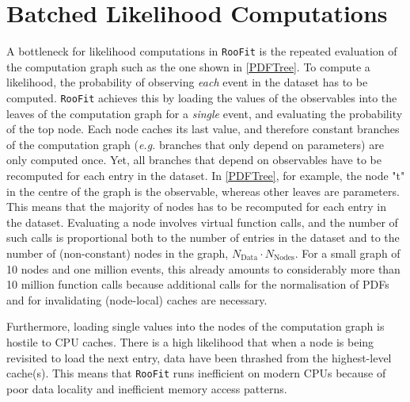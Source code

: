 \documentclass[a4paper]{jpconf}
\newcommand{\RooFit}{\texttt{RooFit}\xspace}
\begin{document}
\section{Batched Likelihood Computations}
A bottleneck for likelihood computations in \RooFit is the repeated evaluation of the computation graph such as the one 
shown in \cref{PDFTree}. To compute a likelihood, the probability of observing \textit{each} event in the dataset has to be computed.
\RooFit achieves this by loading the values of the observables into the leaves of the computation graph for a \textit{single} event, and evaluating the probability of
the top node. Each node caches its last value, and therefore constant branches of the computation graph (\textit{e.g.} branches that only 
depend on parameters) are only computed once.
Yet, all branches that depend on observables have to be recomputed for each entry in the dataset. In \cref{PDFTree}, for example, the node
"t" in the centre of the graph is the observable, whereas other leaves are parameters. This means that the majority of nodes has to be
recomputed for each entry in the dataset. Evaluating a node involves virtual
function calls, and the number of such calls is proportional both to the number of entries in the dataset and
to the number of (non-constant) nodes in the graph, $N_\mathrm{Data} \cdot N_\mathrm{Nodes}$. For a small graph of 10 nodes and one million
events, this already amounts to considerably more than 10 million function calls because additional calls for the normalisation of PDFs and
for invalidating (node-local) caches are necessary.

Furthermore, loading single values into the nodes of the computation graph is hostile to CPU caches. There is a high likelihood that
when a node is being revisited to load the next entry, data have been thrashed from the highest-level cache(s). This means that \RooFit runs inefficient on
modern CPUs because of poor data locality and inefficient memory access patterns.
\end{document}
